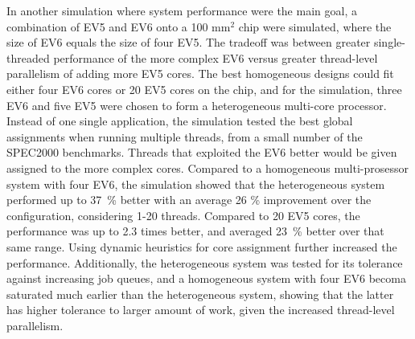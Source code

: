 In another simulation where system performance were the main goal, a combination of EV5 and EV6 onto a 100 mm$^2$ chip were simulated, where the size of EV6 equals the size of four EV5.
The tradeoff was between greater single-threaded performance of the more complex EV6 versus greater thread-level parallelism of adding more EV5 cores.
The best homogeneous designs could fit either four EV6 cores or 20 EV5 cores on the chip, and for the simulation, three EV6 and five EV5 were chosen to form a heterogeneous multi-core processor.
Instead of one single application, the simulation tested the best global assignments when running multiple threads, from a small number of the SPEC2000 benchmarks.
Threads that exploited the EV6 better would be given assigned to the more complex cores.
Compared to a homogeneous multi-prosessor system with four EV6, the simulation showed that the heterogeneous system performed up to 37~\% better with an average 26 \% improvement over the configuration, considering 1-20 threads.
Compared to 20 EV5 cores, the performance was up to 2.3 times better, and averaged 23~\% better over that same range.
Using dynamic heuristics for core assignment further increased the performance.
Additionally, the heterogeneous system was tested for its tolerance against increasing job queues, and a homogeneous system with four EV6 becoma saturated much earlier than the heterogeneous system, showing that the latter has higher tolerance to larger amount of work, given the increased thread-level parallelism.
\cite{heterogeneous-perf}



